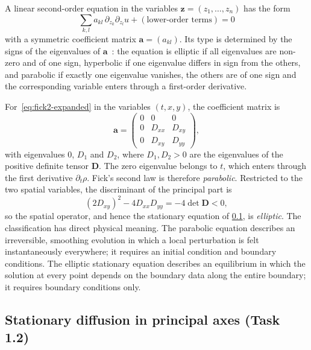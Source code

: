 \documentclass[11pt,a4paper]{article}
\numberwithin{equation}{section}
\theoremstyle{definition}
\theoremstyle{remark}
\newcommand{\bD}{\mathbf{D}}
\begin{document}
A linear second-order equation in the variables $\bm{z} = (z_1,\dots,z_n)$ has the form
\begin{equation*}
  \sum_{k,l} a_{kl}\,\partial_{z_k}\partial_{z_l} u + (\text{lower-order terms}) = 0
\end{equation*}
with a symmetric coefficient matrix $\mathbf{a} = (a_{kl})$. Its type is determined by the signs of the
eigenvalues of $\mathbf{a}$~\citep{evans2010}: the equation is elliptic if all eigenvalues
are non-zero and of one sign, hyperbolic if one eigenvalue differs in sign from the
others, and parabolic if exactly one eigenvalue vanishes, the others are of one sign and
the corresponding variable enters through a first-order derivative.

For~\eqref{eq:fick2-expanded} in the variables $(t,x,y)$, the coefficient matrix is
\begin{equation}\label{eq:symbol}
  \mathbf{a} =
  \begin{pmatrix}
    0 & 0 & 0 \\
    0 & D_{xx} & D_{xy} \\
    0 & D_{xy} & D_{yy}
  \end{pmatrix},
\end{equation}
with eigenvalues $0$, $D_1$ and $D_2$, where $D_1, D_2 > 0$ are the eigenvalues of the
positive definite tensor $\bD$. The zero eigenvalue belongs to $t$, which enters through
the first derivative $\partial_t\rho$. Fick's second law is therefore \emph{parabolic}.
Restricted to the two spatial variables, the discriminant of the principal part is
\begin{equation}\label{eq:discriminant}
  (2D_{xy})^2 - 4D_{xx}D_{yy} = -4\det\bD < 0,
\end{equation}
so the spatial operator, and hence the stationary equation of
\cref{sec:stationary}, is \emph{elliptic}. The classification has direct physical
meaning. The parabolic equation describes an irreversible, smoothing evolution in which
a local perturbation is felt instantaneously everywhere; it requires an initial
condition and boundary conditions. The elliptic stationary equation describes an
equilibrium in which the solution at every point depends on the boundary data along the
entire boundary; it requires boundary conditions only.

\subsection{Stationary diffusion in principal axes (Task 1.2)}\label{sec:stationary}
\end{document}

